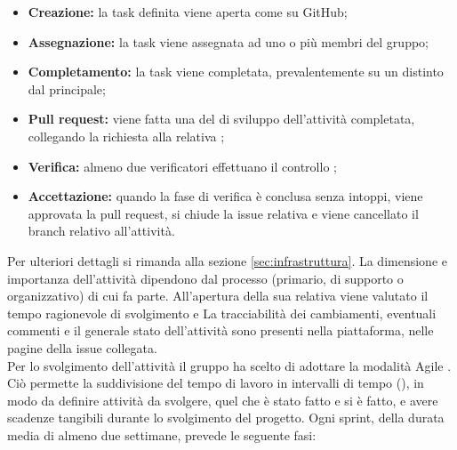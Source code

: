 \begin{itemize}
    \item \textbf{Creazione:} la task definita viene aperta come  su GitHub;
    \item \textbf{Assegnazione:} la task viene assegnata ad uno o più membri del gruppo;
    \item \textbf{Completamento:} la task viene completata, prevalentemente su un  distinto
      dal principale;
  \item \textbf{Pull request:} viene fatta una  del  di sviluppo
      dell'attività completata, collegando la richiesta alla relativa ;
  \item \textbf{Verifica:} almeno due verificatori effettuano il controllo ;
  \item \textbf{Accettazione:} quando la fase di verifica è conclusa senza intoppi, viene approvata la pull request, si chiude la issue relativa e viene cancellato il branch relativo all'attività.
\end{itemize}
Per ulteriori dettagli si rimanda alla sezione \ref{sec:infrastruttura}. La dimensione e importanza
dell'attività dipendono dal processo (primario, di supporto o organizzativo) di cui fa parte.
All'apertura della sua  relativa viene valutato il tempo ragionevole di svolgimento e 
La tracciabilità dei cambiamenti, eventuali commenti e il generale stato dell'attività sono presenti nella piattaforma, nelle pagine della issue collegata.
 \label{sec:metodo_lavoro}\\
Per lo svolgimento dell'attività il gruppo ha scelto di adottare la modalità Agile .\\
Ciò permette la suddivisione del tempo di lavoro in intervalli di tempo (), in modo da definire attività da svolgere, quel che è stato fatto e si è fatto, e avere scadenze tangibili durante lo svolgimento del progetto.
Ogni sprint, della durata media di almeno due settimane, prevede le seguente fasi:
